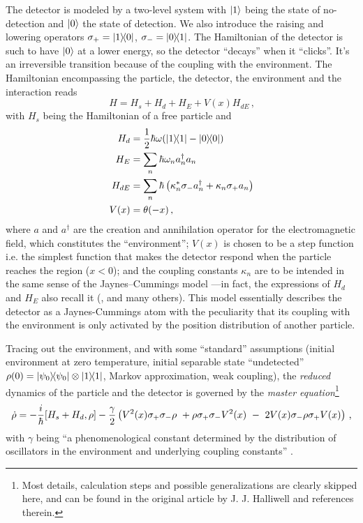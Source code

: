 The detector is modeled by a two-level system with $\ket{1}$ being the state of no-detection
and $\ket{0}$ the state of detection.
We also introduce the raising and lowering operators $\sigma_{+}=\ketbra{1}{0}$, $\sigma_{-}=\ketbra{0}{1}$.
The Hamiltonian of the detector is such to have $\ket{0}$
at a lower energy, so the detector ``decays'' when it ``clicks''. It's an irreversible transition because
of the coupling with the environment.
The Hamiltonian encompassing the particle, the detector, the environment and the interaction reads
\begin{equation}
  H = H_s + H_d + H_{E} + V(x)  H_{dE} \,\text{,}
\end{equation}
with $H_s$ being the Hamiltonian of a free particle and
\begin{subequations}\begin{align}
  H_d     &= \frac{1}{2}\hbar\omega \qty(\ketbra{1} - \ketbra{0}) \\
  H_{E}   &= \sum_n \hbar \omega_n a_n^{\dag} a_n \\
  H_{dE}  &= \sum_n \hbar \left( \kappa^*_n \sigma_{-} a_n^{\dag} + \kappa_n \sigma_{+} a_n \right) \\
  V(x)    &= \theta(-x) \,\text{,}
\end{align}\end{subequations}
where $a$ and $a^{\dagger}$ are the creation and annihilation operator for the electromagnetic field,
which constitutes the ``environment''; $V(x)$ is chosen to be a step function
i.e. the simplest function that makes the detector respond
when the particle reaches the region ($x<0$);
and the coupling constants $\kappa_{n}$ are to be intended in the same sense of the Jaynes--Cummings model
---in fact, the expressions of $H_d$ and $H_E$ also recall it
(\cite[]{WallsMilburn}, \cite{JCM} and many others).
This model essentially describes the detector as a Jaynes-Cummings atom
with the peculiarity that its coupling with the environment
is only activated by the position distribution
of another particle.

Tracing out the environment, and with some ``standard'' assumptions
(initial environment at zero temperature,
initial separable state ``undetected'' $\rho(0) = \ketbra{\psi_0}\otimes\ketbra{1}$,
Markov approximation,
weak coupling),
the \emph{reduced} dynamics of the particle and the detector
is governed by the \emph{master equation}\footnote{
  Most details, calculation steps and possible generalizations are clearly skipped here, and can be found
  in the original article by J. J. Halliwell \parencite{Halliwell_Irreversible}
  and references therein.
}
\begin{equation}
  \dot{\rho} = -\frac{\iu}{\hbar} [ H_s + H_d, \rho]
- { \gamma \over 2} \left( V^2 (x ) \sigma_{+} \sigma_{-}  \rho \ +  \rho
\sigma_{+} \sigma_{-}   V^2 (x)  \ -  \ 2 V (x) \sigma_{-}  \rho \sigma_{+} V (x )
\right)
\,\text{,}
\end{equation}
with $\gamma$ being ``a phenomenological constant determined by the distribution of oscillators in the
environment and underlying coupling constants'' \parencite{Halliwell_Irreversible}.


